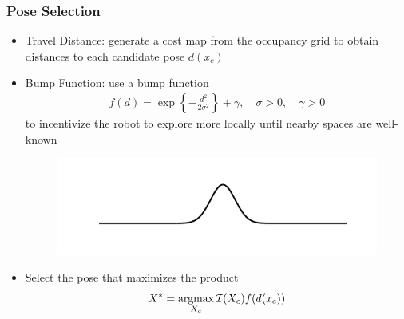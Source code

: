 \documentclass[11pt,professionalfonts,hyperref={pdftex,pdfpagemode=none,pdfstartview=FitH}]{beamer}
\newcommand{\braces}[1]{\ensuremath{\left\{ #1 \right\}}}
\newcommand{\argmax}{\operatornamewithlimits{argmax}}
\begin{document}
\begin{frame}
\frametitle{Pose Selection}

\begin{itemize}
	\item Travel Distance: generate a cost map from the occupancy grid to obtain distances to each candidate pose $d(x_c)$
	\vspace*{0.0cm}\pause
	\item Bump Function: use a bump function \begin{align*}f(d)=\exp\braces{-\frac{d^2}{2\sigma^2}}+\gamma, \quad \sigma>0, \quad \gamma>0\end{align*} to incentivize the robot to explore more locally until nearby spaces are well-known
	\begin{figure}
	\vspace*{-0.010\linewidth}
\centering
	\includegraphics[width=0.8\linewidth]{GaussianBumpFunFlat.png}
		\vspace*{-0.015\linewidth}
\end{figure}
	\vspace*{0.0cm}\pause
	\item Select the pose that maximizes the product \begin{align*}X^*=\argmax_{X_c}{\mathcal I(X_c)f(d(x_c))}\end{align*}
\end{itemize}

\end{frame}
\end{document}
